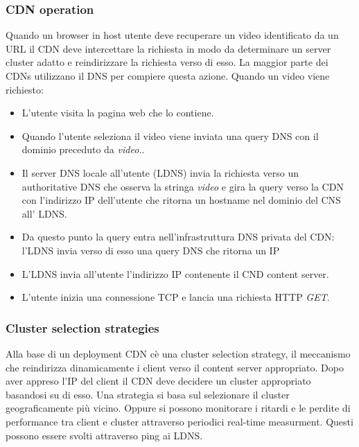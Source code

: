\subsubsection{CDN operation}
Quando un browser in host utente deve recuperare un video identificato da un URL il CDN deve intercettare la richiesta in modo da determinare un server
cluster adatto e reindirizzare la richiesta verso di esso. La maggior parte dei CDNs utilizzano il DNS per compiere questa azione. Quando un video viene
richiesto:
\begin{itemize}
\item L'utente visita la pagina web che lo contiene.
\item Quando l'utente seleziona il video viene inviata una query DNS con il dominio preceduto da \emph{video.}.
\item Il server DNS locale all'utente (LDNS) invia la richiesta verso un authoritative DNS che osserva la stringa \emph{video} e gira la query verso la CDN 
con l'indirizzo IP dell'utente che ritorna un hostname nel dominio del CNS all' LDNS.
\item Da questo punto la query entra nell'infrastruttura DNS privata del CDN: l'LDNS invia verso di esso una query DNS che ritorna un IP
\item L'LDNS invia all'utente l'indirizzo IP contenente il CND content server.
\item L'utente inizia una connessione TCP e lancia una richiesta HTTP \emph{GET}.
\end{itemize}
\subsubsection{Cluster selection strategies}
Alla base di un deployment CDN c\`e una cluster selection strategy, il meccanismo che reindirizza dinamicamente i client verso il content server 
appropriato. Dopo aver appreso l'IP del client il CDN deve decidere un cluster appropriato basandosi su di esso. Una strategia si basa sul selezionare
il cluster geograficamente pi\`u vicino. Oppure si possono monitorare i ritardi e le perdite di performance tra client e cluster attraverso periodici 
real-time measurment. Questi possono essere svolti attraverso ping ai LDNS.
